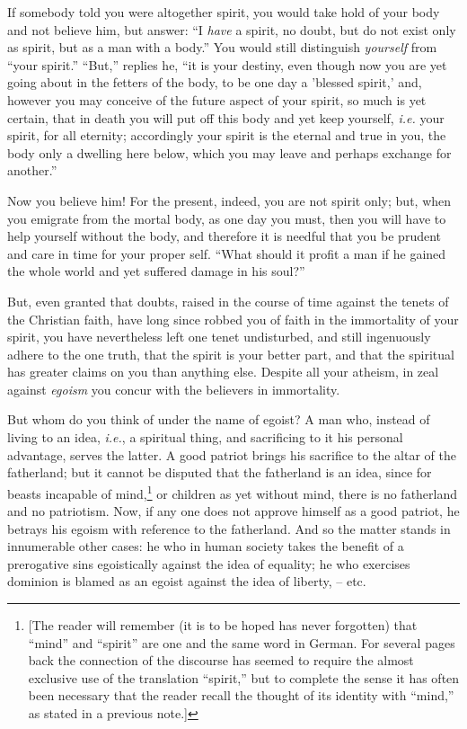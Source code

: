 If somebody told you were altogether spirit, you would take hold of your body 
and not believe him, but answer: ``I \textit{have} a spirit, no doubt, but do 
not exist only as spirit, but as a man with a body.'' You would still 
distinguish \textit{yourself} from ``your spirit.'' ``But,'' replies he, 
``it is your destiny, even though now you are yet going about in the fetters 
of the body, to be one day a 'blessed spirit,' and, however you may conceive 
of the future aspect of your spirit, so much is yet certain, that in death you 
will put off this body and yet keep yourself, \textit{i.e.} your spirit, for 
all eternity; accordingly your spirit is the eternal and true in you, the body 
only a dwelling here below, which you may leave and perhaps exchange for 
another.''

Now you believe him! For the present, indeed, you are not spirit only; but, 
when you emigrate from the mortal body, as one day you must, then you will 
have to help yourself without the body, and therefore it is needful that you 
be prudent and care in time for your proper self. ``What should it profit a 
man if he gained the whole world and yet suffered damage in his soul?''

But, even granted that doubts, raised in the course of time against the tenets 
of the Christian faith, have long since robbed you of faith in the immortality 
of your spirit, you have nevertheless left one tenet undisturbed, and still 
ingenuously adhere to the one truth, that the spirit is your better part, and 
that the spiritual has greater claims on you than anything else. Despite all 
your atheism, in zeal against \textit{egoism} you concur with the believers in 
immortality.

But whom do you think of under the name of egoist? A man who, instead of 
living to an idea, \textit{i.e.}, a spiritual thing, and sacrificing to it 
his personal advantage, serves the latter. A good patriot brings his sacrifice 
to the altar of the fatherland; but it cannot be disputed that the fatherland 
is an idea, since for beasts incapable of mind,\footnote{[The reader will 
remember (it is to be hoped has never forgotten) that ``mind'' and 
``spirit'' are one and the same word in German. For several pages back the 
connection of the discourse has seemed to require the almost exclusive use of 
the translation ``spirit,'' but to complete the sense it has often been 
necessary that the reader recall the thought of its identity with ``mind,'' 
as stated in a previous note.]} or children as yet without mind, there is no 
fatherland and no patriotism. Now, if any one does not approve himself as a 
good patriot, he betrays his egoism with reference to the fatherland. And so 
the matter stands in innumerable other cases: he who in human society takes 
the benefit of a prerogative sins egoistically against the idea of equality; 
he who exercises dominion is blamed as an egoist against the idea of liberty, 
-- etc.

